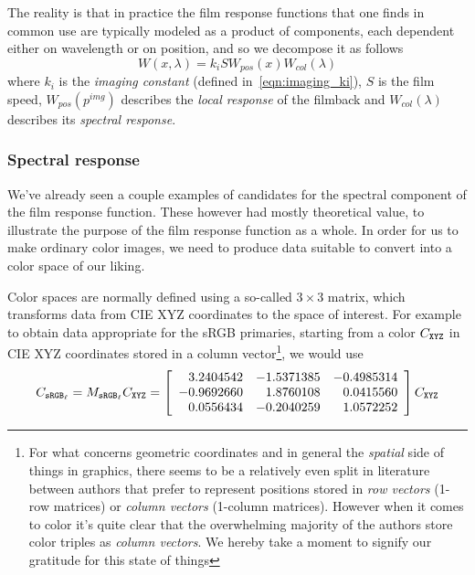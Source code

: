 The reality is that in practice the film response functions 
that one finds in common use are typically modeled as a product of
components, each dependent either on wavelength or on position, 
and so we decompose it as follows
\begin{equation}
W(x,\lambda) = k_i S W_{pos}(x) W_{col}(\lambda)
\end{equation}
where $k_i$ is the \textsl{imaging constant} (defined in~\cref{eqn:imaging_ki}), 
$S$ is the \gls{film speed},
$W_{pos}(p^{img})$ describes the \textsl{local response} of the filmback 
and
$W_{col}(\lambda)$ describes its \textsl{spectral response}.

\subsubsection{Spectral response}\label{sec:spectral_response}
We've already seen a couple examples of candidates for the spectral component
of the \gls{film response function}. These however had mostly theoretical value,
to illustrate the purpose of the film response function as a whole.
In order for us to make ordinary color images, we need to produce data
suitable to convert into a color space of our liking.

Color spaces are normally defined using a so-called $3\times3$ matrix, which
transforms data from \gls{CIE} \gls{XYZ} coordinates to the space of interest. 
For example to obtain data appropriate for the \gls{sRGB} primaries, starting from
a color $C_{\texttt{XYZ}}$ in \gls{CIE} \gls{XYZ} coordinates stored in a column vector\footnote{
	For what concerns geometric coordinates and in general the \emph{spatial} side of things
	in graphics, there seems to be a relatively even split in literature between authors that prefer 
	to represent positions stored in \textsl{row vectors} (1-row matrices) 
	or \textsl{column vectors} (1-column matrices).
	However when it comes to color it's quite clear that the overwhelming majority of the authors
	store color triples as \textsl{column vectors}. 
	We hereby take a moment to signify our gratitude for this state of things
}, we would use
\begin{displaymath}
	C_{\sRGBl} = M_{\sRGBl} C_{\XYZ} = \left[\begin{array}{r@{.}lr@{.}lr@{.}l}
		3&2404542 & -1&5371385 & -0&4985314 \\
		-0&9692660 &  1&8760108 &  0&0415560 \\
		0&0556434 & -0&2040259 &  1&0572252 \\
	\end{array}\right] C_{\XYZ}
\end{displaymath}

